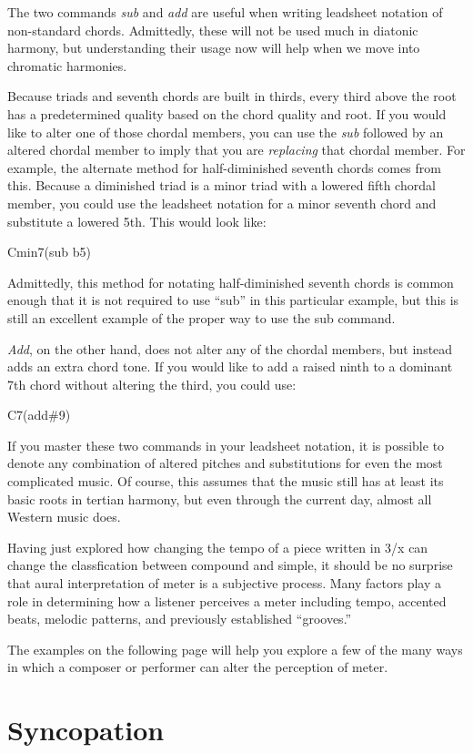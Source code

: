 \documentclass{book}
\begin{document}
The two commands \emph{sub} and \emph{add} are useful when writing leadsheet
notation of non-standard chords. Admittedly, these will not be used much in
diatonic harmony, but understanding their usage now will help when we move
into chromatic harmonies.

Because triads and seventh chords are built in thirds, every third above the
root has a predetermined quality based on the chord quality and root. If you
would like to alter one of those chordal members, you can use the \emph{sub}
followed by an altered chordal member to imply that you are \emph{replacing}
that chordal member. For example, the alternate method for half-diminished
seventh chords comes from this. Because a diminished triad is a minor triad
with a lowered fifth chordal member, you could use the leadsheet notation for
a minor seventh chord and substitute a lowered 5th. This would look like:

Cmin7(sub b5)

Admittedly, this method for notating half-diminished seventh chords is common
enough that it is not required to use ``sub'' in this particular example, but
this is still an excellent example of the proper way to use the sub command.

\emph{Add}, on the other hand, does not alter any of the chordal members, but
instead adds an extra chord tone. If you would like to add a raised ninth to a
dominant 7th chord without altering the third, you could use:

C7(add\#9)

If you master these two commands in your leadsheet notation, it is possible to
denote any combination of altered pitches and substitutions for even the most
complicated music. Of course, this assumes that the music still has at least
its basic roots in tertian harmony, but even through the current day, almost
all Western music does.

Having just explored how changing the tempo of a piece written in 3/x can
change the classfication between compound and simple, it should be no surprise
that aural interpretation of meter is a subjective process. Many factors play
a role in determining how a listener perceives a meter including tempo,
accented beats, melodic patterns, and previously established ``grooves.''

The examples on the following page will help you explore a few of the many
ways in which a composer or performer can alter the perception of meter.

\hypertarget{syncopation}{%
\section{Syncopation}\label{syncopation}}
\end{document}
